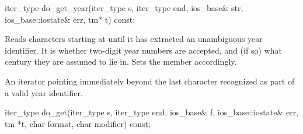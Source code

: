 %
%
\begin{itemdecl}
iter_type do_get_year(iter_type s, iter_type end, ios_base& str,
                      ios_base::iostate& err, tm* t) const;
\end{itemdecl}

\begin{itemdescr}
\pnum
\effects
Reads characters starting at 
until it has extracted an unambiguous year identifier.
It is
 whether
two-digit year numbers are accepted,
and (if so) what century they are assumed to lie in.
Sets the
member accordingly.

\pnum
\returns
An iterator pointing immediately beyond the last character recognized
as part of a valid year identifier.
\end{itemdescr}

%
%
\begin{itemdecl}
iter_type do_get(iter_type s, iter_type end, ios_base& f,
    ios_base::iostate& err, tm *t, char format, char modifier) const;
\end{itemdecl}

